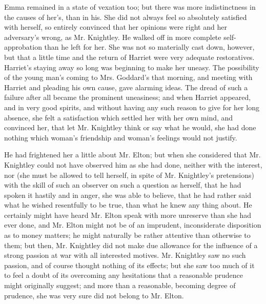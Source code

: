 Emma remained in a state of vexation too; but there was more indistinctness in the causes of her's, than in his. She did not always feel so absolutely satisfied with herself, so entirely convinced that her opinions were right and her adversary's wrong, as Mr. Knightley. He walked off in more complete self-approbation than he left for her. She was not so materially cast down, however, but that a little time and the return of Harriet were very adequate restoratives. Harriet's staying away so long was beginning to make her uneasy. The possibility of the young man's coming to Mrs. Goddard's that morning, and meeting with Harriet and pleading his own cause, gave alarming ideas. The dread of such a failure after all became the prominent uneasiness; and when Harriet appeared, and in very good spirits, and without having any such reason to give for her long absence, she felt a satisfaction which settled her with her own mind, and convinced her, that let Mr. Knightley think or say what he would, she had done nothing which woman's friendship and woman's feelings would not justify.

He had frightened her a little about Mr. Elton; but when she considered that Mr. Knightley could not have observed him as she had done, neither with the interest, nor (she must be allowed to tell herself, in spite of Mr. Knightley's pretensions) with the skill of such an observer on such a question as herself, that he had spoken it hastily and in anger, she was able to believe, that he had rather said what he wished resentfully to be true, than what he knew any thing about. He certainly might have heard Mr. Elton speak with more unreserve than she had ever done, and Mr. Elton might not be of an imprudent, inconsiderate disposition as to money matters; he might naturally be rather attentive than otherwise to them; but then, Mr. Knightley did not make due allowance for the influence of a strong passion at war with all interested motives. Mr. Knightley saw no such passion, and of course thought nothing of its effects; but she saw too much of it to feel a doubt of its overcoming any hesitations that a reasonable prudence might originally suggest; and more than a reasonable, becoming degree of prudence, she was very sure did not belong to Mr. Elton.

